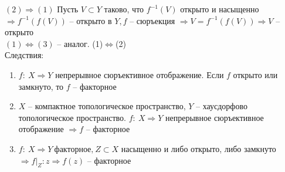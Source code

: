 	$(2) \Rightarrow (1)$ Пусть $V\subset Y$ таково, что $f^{-1}(V)$ открыто и насыщенно $\Rightarrow f^{-1}(f(V))$ -- открыто в $Y, f$ -- сюръекция $\Rightarrow V=f^{-1}(f(V)) \Rightarrow V$ -- открыто\\
	$(1)\Leftrightarrow (3)$ -- аналог. (1)$\Leftrightarrow$(2)\\
	Следствия: 
	\begin{enumerate}
		\item 
		$f:\ X\Rightarrow Y$ непрерывное сюръективное отображение. Если $f$ открыто или замкнуто, то $f$ -- факторное
		\item 
		$X$ -- компактное топологическое пространство, $Y$ -- хаусдорфово топологическое пространство. $f:\ X\Rightarrow Y$ непрерывное сюръективное отображение $\Rightarrow f$ -- факторное
		\item 
		$f:\ X\Rightarrow Y\ \text{факторное,}\ Z \subset X$ насыщенно и либо открыто, либо замкнуто $\Rightarrow f|_{Z}: z \Rightarrow f(z)$ -- факторное 
	\end{enumerate}


\newpage
